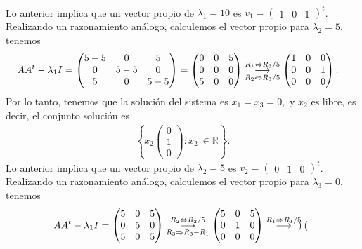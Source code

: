 \documentclass[11pt,letterpaper]{article}
\newcommand{\mR}{\mathbb{R}}
\newcommand{\grstep}[2][\relax]{%
   \ensuremath{\mathrel{
       {\mathop{\longrightarrow}\limits^{#2\mathstrut}_{
                                     \begin{subarray}{l} #1 \end{subarray}}}}}}
\begin{document}
\begin{enumerate}
\begin{align*}
\end{align*}
Lo anterior implica que un vector propio de $\lambda_1=10$ es 
$v_1=\begin{pmatrix}
1 & 0 & 1
\end{pmatrix}^t$. Realizando un razonamiento análogo, calculemos el vector propio para $\lambda_2=5$, tenemos 
\begin{align*}
AA^t-\lambda_1I&=\begin{pmatrix}
5-5 & 0 & 5\\
0& 5-5 & 0\\
5 & 0 & 5-5
\end{pmatrix}=\begin{pmatrix}
0 & 0 & 5\\
0& 0 & 0\\
5 & 0 & 0
\end{pmatrix}%
\grstep[R_2 \Leftrightarrow R_3/5]{R_1 \Leftrightarrow R_3/5}
%
\begin{pmatrix}
 1 & 0 & 0 \\
 0 & 0 & 1\\
 0 & 0 & 0
\end{pmatrix}.
\end{align*}
Por lo tanto, tenemos que la solución del sistema es $x_1=x_3=0,$ y $x_2$ es libre, es decir, el conjunto solución es
\begin{align*}
\left\{x_2\begin{pmatrix}
0\\
1\\
0
\end{pmatrix}: x_2 \ \in \mR \right\}.
\end{align*}
Lo anterior implica que un vector propio de $\lambda_2=5$ es 
$v_2=\begin{pmatrix}
0 & 1 & 0
\end{pmatrix}^t$.
Realizando un razonamiento análogo, calculemos el vector propio para $\lambda_3=0$, tenemos 
\begin{align*}
AA^t-\lambda_1I&=\begin{pmatrix}
5 & 0 & 5\\
0& 5 & 0\\
5 & 0 & 5
\end{pmatrix}%
\grstep[R_3 \Rightarrow R_3-R_1]{R_2 \Leftrightarrow R_2/5}
%
\begin{pmatrix}
5 & 0 & 5\\
0& 1 & 0\\
0 & 0 & 0
\end{pmatrix}
%
\grstep[]{R_1 \Rightarrow R_1/5}
%
\begin{pmatrix}

\end{pmatrix}
\end{align*}
\end{enumerate}
\end{document}
